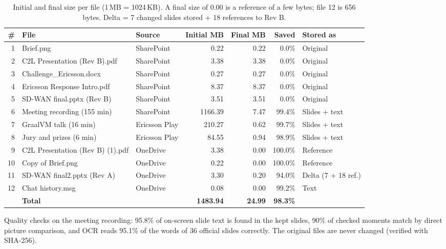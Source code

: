 \documentclass[11pt,a4paper]{article}
\begin{document}
\begin{table}[H]
\centering
\footnotesize
\begin{tabularx}{\textwidth}{@{}r X l r r r l@{}}
\toprule
\# & \textbf{File} & \textbf{Source} & \textbf{Initial MB} & \textbf{Final MB} & \textbf{Saved} & \textbf{Stored as} \\
\midrule
1 & Brief.png & SharePoint & 0.22 & 0.22 & 0.0\% & Original \\
2 & C2L Presentation (Rev B).pdf & SharePoint & 3.38 & 3.38 & 0.0\% & Original \\
3 & Challenge\_Ericsson.docx & SharePoint & 0.27 & 0.27 & 0.0\% & Original \\
4 & Ericsson Response Intro.pdf & SharePoint & 8.37 & 8.37 & 0.0\% & Original \\
5 & SD-WAN final.pptx (Rev B) & SharePoint & 3.51 & 3.51 & 0.0\% & Original \\
6 & Meeting recording (155 min) & SharePoint & 1166.39 & 7.47 & 99.4\% & Slides + text \\
7 & GraalVM talk (16 min) & Ericsson Play & 210.27 & 0.62 & 99.7\% & Slides + text \\
8 & Jury and prizes (6 min) & Ericsson Play & 84.55 & 0.94 & 98.9\% & Slides + text \\
9 & C2L Presentation (Rev B) (1).pdf & OneDrive & 3.38 & 0.00 & 100.0\% & Reference \\
10 & Copy of Brief.png & OneDrive & 0.22 & 0.00 & 100.0\% & Reference \\
11 & SD-WAN final2.pptx (Rev A) & OneDrive & 3.30 & 0.20 & 94.0\% & Delta (7 + 18 ref.) \\
12 & Chat history.msg & OneDrive & 0.08 & 0.00 & 99.2\% & Text \\
\midrule
 & \textbf{Total} & & \textbf{1483.94} & \textbf{24.99} & \textbf{98.3\%} & \\
\bottomrule
\end{tabularx}
\caption{Initial and final size per file (1\,MB = 1024\,KB). A final size of 0.00 is a reference of a few bytes; file 12 is 656 bytes. Delta = 7 changed slides stored + 18 references to Rev B.}
\end{table}

Quality checks on the meeting recording: 95.8\% of on-screen slide text is found in the kept slides,
90\% of checked moments match by direct picture comparison, and OCR reads 95.1\% of the words of 36 official slides correctly.
The original files are never changed (verified with SHA-256).
\end{document}
